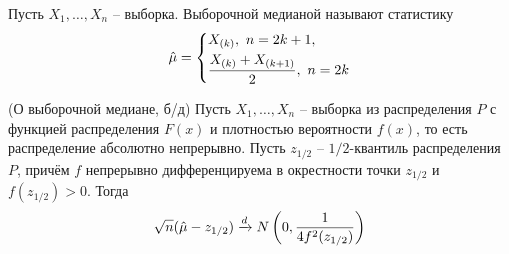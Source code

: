 \begin{definition}
    Пусть $X_1, \dots, X_n$ -- выборка. Выборочной медианой называют статистику
    \[
        \hat{\mu} = \left\{\begin{aligned}
            & X_{(k)},\ n = 2k+1,
            \\
            & \frac{X_{(k)} + X_{(k+1)}}{2},\ n = 2k
        \end{aligned}\right.
    \]
\end{definition}

\begin{theorem} (О выборочной медиане, б/д)
    Пусть $X_1, \dots, X_n$ -- выборка из распределения $P$ с функцией распределения $F(x)$ и плотностью вероятности $f(x)$, то есть распределение абсолютно непрерывно. Пусть $z_{1/2}$ -- $1/2$-квантиль распределения $P$, причём $f$ непрерывно дифференцируема в окрестности точки $z_{1/2}$ и $f(z_{1/2}) > 0$. Тогда
    \[
        \sqrt{n}(\hat{\mu} - z_{1/2}) \xrightarrow{d} N\left(0, \frac{1}{4 f^2(z_{1/2})}\right)
    \]
\end{theorem}